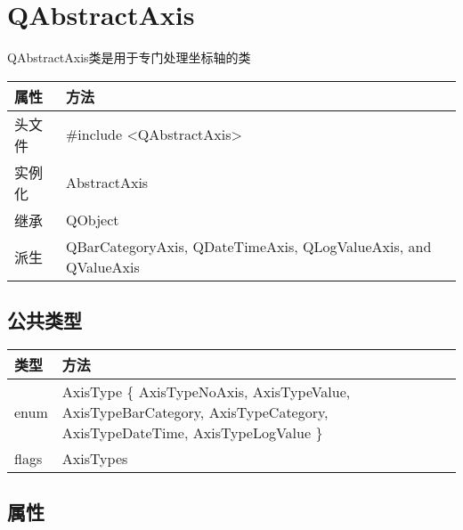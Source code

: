 \chapter{QAbstractAxis}

QAbstractAxis类是用于专门处理坐标轴的类

\begin{longtable}[l]{|l|l|}
\hline
属性 & 方法 \\
\hline
头文件 & \#include <QAbstractAxis>\\      
\hline
实例化 & AbstractAxis\\      
\hline
继承&QObject \\
\hline
派生 & QBarCategoryAxis, QDateTimeAxis, QLogValueAxis, and QValueAxis \\
\hline
\end{longtable}

\splitLine

\section{公共类型}

\begin{longtable}[l]{|l|p{6in}|}
\hline
类型 & 方法 \\
\hline
enum & AxisType \{ AxisTypeNoAxis, AxisTypeValue, AxisTypeBarCategory, AxisTypeCategory, AxisTypeDateTime, AxisTypeLogValue \}\\
\hline
flags &	AxisTypes\\
\hline
\end{longtable}

\section{属性}

